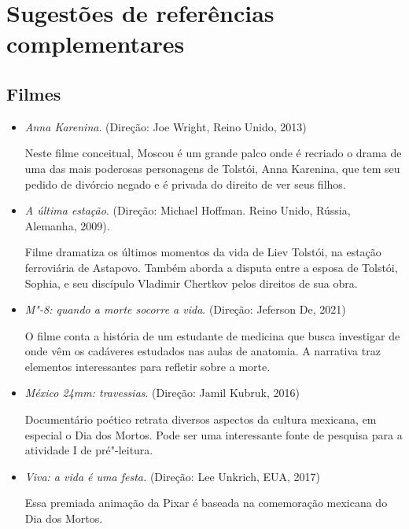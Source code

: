 \documentclass[12pt]{extarticle}
\begin{document}


\section{Sugestões de referências complementares}


\subsection{Filmes}

\begin{itemize}
\item\textit{Anna Karenina}. (Direção: Joe Wright, Reino Unido, 2013)

Neste filme conceitual, Moscou é um grande palco onde é recriado o drama
de uma das mais poderosas personagens de Tolstói, Anna Karenina, que tem
seu pedido de divórcio negado e é privada do direito de ver seus filhos.

\item\textit{A última estação}. (Direção: Michael Hoffman. Reino Unido, Rússia,
Alemanha, 2009).

Filme dramatiza os últimos momentos da vida de Liev Tolstói, na estação
ferroviária de Astapovo. Também aborda a disputa entre a esposa de
Tolstói, Sophia, e seu discípulo Vladimir Chertkov pelos direitos de sua
obra.

\item\textit{M"-8: quando a morte socorre a vida}. (Direção: Jeferson De, 2021)

O filme conta a história de um estudante de medicina que busca investigar
de onde vêm os cadáveres estudados nas aulas de anatomia. A narrativa traz
elementos interessantes para refletir sobre a morte.

\item\textit{México 24mm: travessias}. (Direção: Jamil Kubruk, 2016)

Documentário poético retrata diversos aspectos da cultura mexicana, em especial o Dia dos Mortos. Pode ser uma interessante fonte de pesquisa para a atividade I de pré"-leitura.

\item\textit{Viva: a vida é uma festa.} (Direção: Lee Unkrich, EUA, 2017)

Essa premiada animação da Pixar é baseada na comemoração mexicana do Dia dos Mortos.
\end{itemize}
\end{document}
